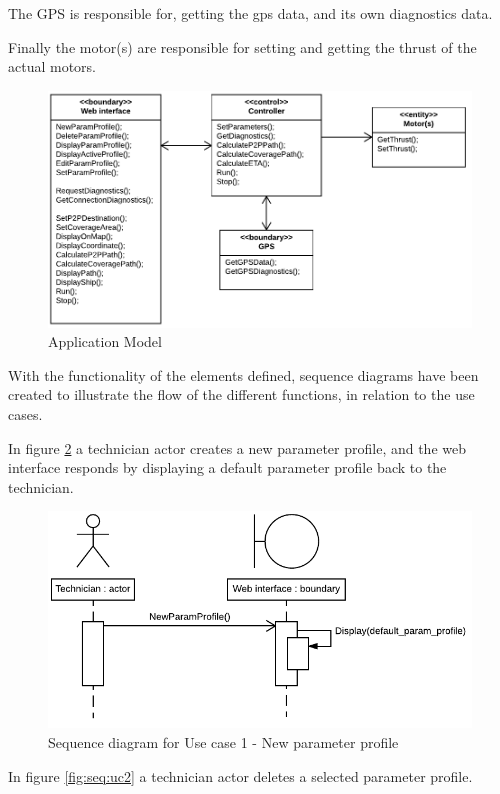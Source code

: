 The GPS is responsible for, getting the gps data, and its own diagnostics data.

Finally the motor(s) are responsible for setting and getting the thrust of the actual motors.

\begin{figure}[h]
	\centering
	\includegraphics[width=1\linewidth]{Images/System_architecture/Application_Model}
	\caption{Application Model}
	\label{fig:appliction_model}
\end{figure}

With the functionality of the elements defined, sequence diagrams have been created to illustrate the flow of the different functions, in relation to the use cases.

In figure \ref{fig:seq:uc1} a technician actor creates a new parameter profile, and the web interface responds by displaying a default parameter profile back to the technician.

\begin{figure}[H]
	\centering
	\includegraphics[width=0.8\linewidth]{Images/System_architecture/Use_case_1_SD}
	\caption{Sequence diagram for Use case 1 - New parameter profile}
	\label{fig:seq:uc1}
\end{figure}

In figure \ref{fig:seq:uc2} a technician actor deletes a selected parameter profile.


